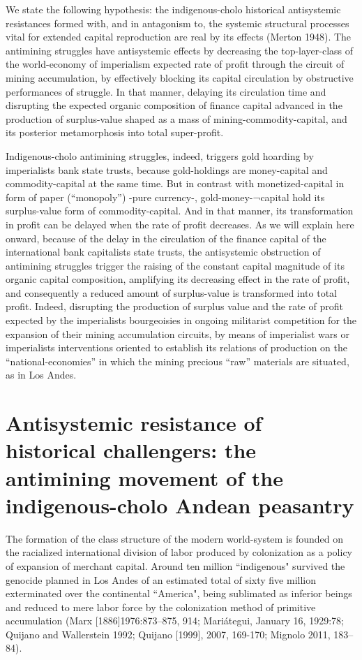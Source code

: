 \documentclass[]{interact}
\theoremstyle{plain}%
\theoremstyle{definition}
\theoremstyle{remark}
\begin{document}
We state the following hypothesis: the indigenous-cholo historical antisystemic resistances formed with, and in antagonism to, the systemic structural processes vital for extended capital reproduction are real by its effects (Merton 1948). The antimining struggles have antisystemic effects by decreasing the top-layer-class of the world-economy of imperialism expected rate of profit through the circuit of mining accumulation, by effectively blocking its capital circulation by obstructive performances of struggle. In that manner, delaying its circulation time and disrupting the expected organic composition of finance capital advanced in the production of surplus-value shaped as a mass of mining-commodity-capital, and its posterior metamorphosis into total super-profit.

Indigenous-cholo antimining struggles, indeed, triggers gold hoarding by imperialists bank state trusts, because gold-holdings are money-capital and commodity-capital at the same time. But in contrast with monetized-capital in form of paper (“monopoly”) -pure currency-, gold-money-¬capital hold its surplus-value form of commodity-capital. And in that manner, its transformation in profit can be delayed when the rate of profit decreases. As we will explain here onward, because of the delay in the circulation of the finance capital of the international bank capitalists state trusts, the antisystemic obstruction of antimining struggles trigger the raising of the constant capital magnitude of its organic capital composition, amplifying its decreasing effect in the rate of profit, and consequently a reduced amount of surplus-value is transformed into total profit. Indeed, disrupting the production of surplus value and the rate of profit expected by the imperialists bourgeoisies in ongoing militarist competition for the expansion of their mining accumulation circuits, by means of imperialist wars or imperialists interventions oriented to establish its relations of production on the “national-economies” in which the mining precious “raw” materials are situated, as in Los Andes.

\section{Antisystemic resistance of historical challengers: the antimining movement of the indigenous-cholo Andean peasantry}

The formation of the class structure of the modern world-system is founded on the racialized international division of labor produced by colonization as a policy of expansion of merchant capital. Around ten million “indigenous" survived the genocide planned in Los Andes of an estimated total of sixty five million exterminated over the continental “America", being sublimated as inferior beings and reduced to mere labor force by the colonization method of primitive accumulation (Marx [1886]1976:873–875, 914; Mariátegui, January 16, 1929:78; Quijano and Wallerstein 1992; Quijano [1999], 2007, 169-170; Mignolo 2011, 183–84).
\end{document}
